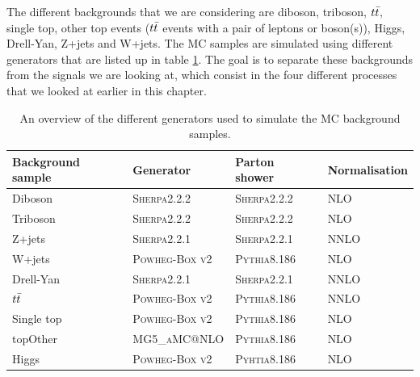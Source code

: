 The different backgrounds that we are considering are diboson, triboson, $t\Bar{t}$, single top, other top events ($t\Bar{t}$ events with a pair of leptons or boson(s)), Higgs, Drell-Yan, Z+jets and W+jets. The MC samples are simulated using different generators that are listed up in table \ref{tab:bkg_samples}. The goal is to separate these backgrounds from the signals we are looking at, which consist in the four different processes that we looked at earlier in this chapter. 

\begin{table}[H]
    \centering
    \begin{tabular}{l l l l} \toprule
        \textbf{Background sample} & \textbf{Generator} & \textbf{Parton shower} & \textbf{Normalisation}\\
        \midrule
        \midrule
        Diboson & \textsc{Sherpa2.2.2}\cite{sherpa2_1, sherpa1_2, sherpa1_3} & \textsc{Sherpa2.2.2} & NLO \cite{NLO}\\
        Triboson & \textsc{Sherpa2.2.2} & \textsc{Sherpa2.2.2} & NLO \\
        Z+jets & \textsc{Sherpa2.2.1} \cite{sherpa1_1, sherpa1_2, sherpa1_3} & \textsc{Sherpa2.2.1} & NNLO \cite{NNLO}\\
        W+jets & \textsc{Powheg-Box v2}\cite{49Z, 50Z} & \textsc{Pythia8.186} \cite{49} & NLO\\
        Drell-Yan & \textsc{Sherpa2.2.1} & \textsc{Sherpa2.2.1} & NNLO\\
        $t\Bar{t}$ & \textsc{Powheg-Box v2} & \textsc{Pythia8.186} & NNLO\\
        Single top & \textsc{Powheg-Box v2} & \textsc{Pythia8.186} & NLO\\
        topOther & \textsc{MG5\_aMC@NLO} \cite{48} & \textsc{Pythia8.186} & NLO\\
        Higgs & \textsc{Powheg-Box v2} & \textsc{Pyhtia8.186} & NLO\\
        \bottomrule
    \end{tabular}
    \caption{An overview of the different generators used to simulate the MC background samples.}
    \label{tab:bkg_samples}
\end{table}



